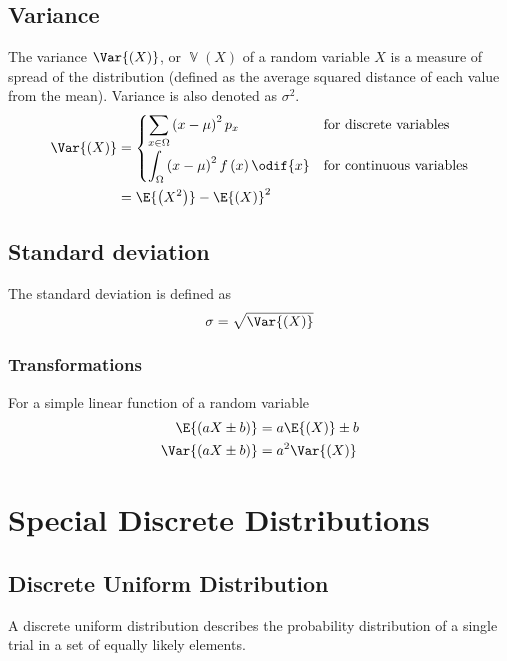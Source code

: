 \documentclass{article}
\begin{document}
\begin{multicols}{3}
    \subsection{Variance}
    The variance \(\Var{\left( X \right)}\), or \(\operatorname{\mathbb{V}}{\left( X \right)}\) of a random variable \(X\) is a measure of spread
    of the distribution (defined as the average squared distance of each value from the mean).
    Variance is also denoted as \(\sigma^2\).
    \begin{align*}
        \Var{\left( X \right)} & =
        \begin{cases}
            \displaystyle \sum_{x \in \Omega} \left( x - \mu \right)^2 p_x                  & \text{for discrete variables}   \\[0.4cm]
            \displaystyle \int_{\Omega} \left( x - \mu \right)^2 f\left( x \right) \odif{x} & \text{for continuous variables}
        \end{cases} \\
                               & = \E{\left( X^2 \right)} - \E{\left( X \right)}^2
    \end{align*}
    \subsection{Standard deviation}
    The standard deviation is defined as
    \begin{equation*}
        \sigma = \sqrt{\Var{\left( X \right)}}
    \end{equation*}
    \subsubsection{Transformations}
    For a simple linear function of a random variable
    \begin{align*}
        \E{\left( aX \pm b \right)}   & = a\E{\left( X \right)} \pm b \\
        \Var{\left( aX \pm b \right)} & = a^2\Var{\left( X \right)}
    \end{align*}
    \section{Special Discrete Distributions}
    \subsection{Discrete Uniform Distribution}
    A discrete uniform distribution describes the probability distribution of a single trial
    in a set of equally likely elements.


\end{multicols}
\end{document}
